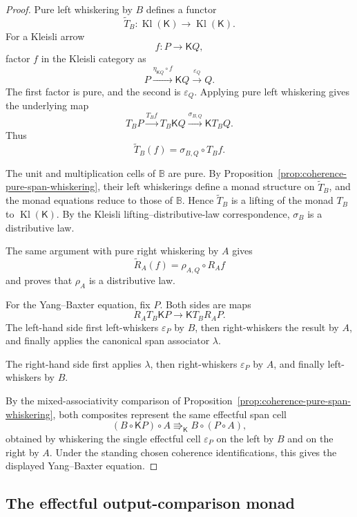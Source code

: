 \begin{proof}
Pure left whiskering by \(B\) defines a functor
\[
    \widetilde T_B:
    \operatorname{Kl}(\mathsf K)
    \longrightarrow
    \operatorname{Kl}(\mathsf K).
\]
For a Kleisli arrow
\[
    f:P\to\mathsf KQ,
\]
factor \(f\) in the Kleisli category as
\[
    P
    \xrightarrow{\eta_{\mathsf KQ}\circ f}
    \mathsf KQ
    \xrightarrow{\varepsilon_Q}
    Q.
\]
The first factor is pure, and the second is \(\varepsilon_Q\).
Applying pure left whiskering gives the underlying map
\[
    T_BP
    \xrightarrow{T_Bf}
    T_B\mathsf KQ
    \xrightarrow{\sigma_{B,Q}}
    \mathsf KT_BQ.
\]
Thus
\[
    \widetilde T_B(f)
    =
    \sigma_{B,Q}\circ T_Bf.
\]

The unit and multiplication cells of \(\mathbb B\) are pure.  By
Proposition~\ref{prop:coherence-pure-span-whiskering}, their left
whiskerings define a monad structure on \(\widetilde T_B\), and the monad
equations reduce to those of \(\mathbb B\).  Hence \(\widetilde T_B\) is a
lifting of the monad \(T_B\) to \(\operatorname{Kl}(\mathsf K)\).
By the Kleisli lifting--distributive-law correspondence, \(\sigma_B\) is a
distributive law.

The same argument with pure right whiskering by \(A\) gives
\[
    \widetilde R_A(f)
    =
    \rho_{A,Q}\circ R_Af
\]
and proves that \(\rho_A\) is a distributive law.

For the Yang--Baxter equation, fix \(P\).  Both sides are maps
\[
    R_AT_B\mathsf KP
    \longrightarrow
    \mathsf KT_BR_AP.
\]
The left-hand side first left-whiskers
\(\varepsilon_P\) by \(B\), then right-whiskers the result by \(A\), and
finally applies the canonical span associator \(\lambda\).

The right-hand side first applies \(\lambda\), then right-whiskers
\(\varepsilon_P\) by \(A\), and finally left-whiskers by \(B\).

By the mixed-associativity comparison of
Proposition~\ref{prop:coherence-pure-span-whiskering}, both composites
represent the same effectful span cell
\[
    (B\circ\mathsf KP)\circ A
    \Rrightarrow_{\mathsf K}
    B\circ(P\circ A),
\]
obtained by whiskering the single effectful cell
\(\varepsilon_P\) on the left by \(B\) and on the right by \(A\).
Under the standing chosen coherence identifications, this gives the displayed
Yang--Baxter equation.
\end{proof}

\subsection{The effectful output-comparison monad}
\label{subsec:effectful-output-comparison-monad}

